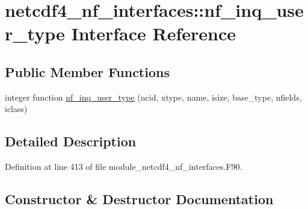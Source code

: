 \hypertarget{interfacenetcdf4__nf__interfaces_1_1nf__inq__user__type}{}\section{netcdf4\+\_\+nf\+\_\+interfaces\+:\+:nf\+\_\+inq\+\_\+user\+\_\+type Interface Reference}
\label{interfacenetcdf4__nf__interfaces_1_1nf__inq__user__type}
\subsection*{Public Member Functions}
\begin{DoxyCompactItemize}
\item 
integer function \hyperlink{interfacenetcdf4__nf__interfaces_1_1nf__inq__user__type_aba6760581b5b8b3115fa4fbe53954c33}{nf\+\_\+inq\+\_\+user\+\_\+type} (ncid, xtype, name, isize, base\+\_\+type, nfields, iclass)
\end{DoxyCompactItemize}


\subsection{Detailed Description}


Definition at line 413 of file module\+\_\+netcdf4\+\_\+nf\+\_\+interfaces.\+F90.



\subsection{Constructor \& Destructor Documentation}
\mbox{\label{interfacenetcdf4__nf__interfaces_1_1nf__inq__user__type_aba6760581b5b8b3115fa4fbe53954c33}} 
